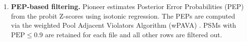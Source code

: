 \documentclass[pdflatex,sn-nature]{sn-jnl}
\begin{document}
\begin{enumerate}
\item \textbf{PEP-based filtering.} Pioneer estimates Posterior Error Probabilities (PEP) from the probit Z-scores using isotonic regression. The PEPs are computed via the weighted Pool Adjacent Violators Algorithm (wPAVA) \cite{Barlow1972-isotonic}. PSMs with $\text{PEP} \leq 0.9$ are retained for each file and all other rows are filtered out. 

%
%
\end{enumerate}

\end{document}
